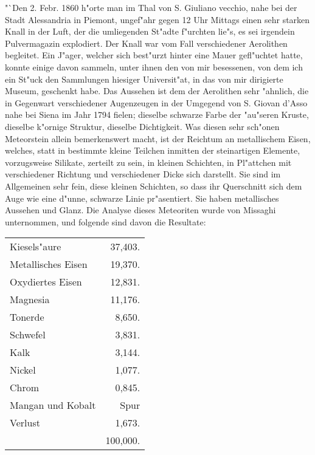 \documentclass[a4paper, 11pt, oneside]{article}
\begin{document}
"`Den 2. Febr. 1860 h"orte man im Thal von S. Giuliano vecchio, nahe bei der Stadt Alessandria in Piemont, ungef"ahr gegen 12 Uhr Mittags einen sehr starken Knall in der Luft, der die umliegenden St"adte f"urchten lie"s, es sei irgendein Pulvermagazin explodiert. Der Knall war vom Fall verschiedener Aerolithen begleitet. Ein J"ager, welcher sich best"urzt hinter eine Mauer gefl"uchtet hatte, konnte einige davon sammeln, unter ihnen den von mir besessenen, von dem ich ein St"uck den Sammlungen hiesiger Universit"at, in das von mir dirigierte Museum, geschenkt habe. Das Aussehen ist dem der Aerolithen sehr "ahnlich, die in Gegenwart verschiedener Augenzeugen in der Umgegend von S. Giovan d'Asso nahe bei Siena im Jahr 1794 fielen; dieselbe schwarze Farbe der "au"seren Kruste, dieselbe k"ornige Struktur, dieselbe Dichtigkeit. Was diesen sehr sch"onen Meteorstein allein bemerkenswert macht, ist der Reichtum an metallischem Eisen, welches, statt in bestimmte kleine Teilchen inmitten der steinartigen Elemente, vorzugsweise Silikate, zerteilt zu sein, in kleinen Schichten, in Pl"attchen mit verschiedener Richtung und verschiedener Dicke sich darstellt. Sie sind im Allgemeinen sehr fein, diese kleinen Schichten, so dass ihr Querschnitt sich dem Auge wie eine d"unne, schwarze Linie pr"asentiert. Sie haben metallisches Aussehen und Glanz. Die Analyse dieses Meteoriten wurde von Missaghi unternommen, und folgende sind davon die Resultate:
\begin{table}[H]
    \centering\swabfamily\Large
    \begin{tabular}{l r}
        Kiesels"aure & 37,403. \\
        Metallisches Eisen & 19,370. \\
        Oxydiertes Eisen & 12,831. \\
        Magnesia & 11,176. \\
        Tonerde & 8,650. \\
        Schwefel & 3,831. \\
        Kalk & 3,144. \\
        Nickel & 1,077. \\
        Chrom & 0,845. \\
        Mangan und Kobalt  & Spur \\
        Verlust & 1,673. \\
         & 100,000. \\
    \end{tabular}
\end{table}
\end{document}
